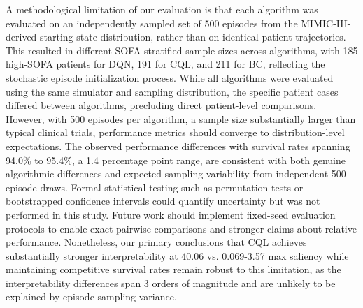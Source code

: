 A methodological limitation of our evaluation is that each algorithm was evaluated on an independently sampled set of 500 episodes from the MIMIC-III-derived starting state distribution, rather than on identical patient trajectories. This resulted in different SOFA-stratified sample sizes across algorithms, with 185 high-SOFA patients for DQN, 191 for CQL, and 211 for BC, reflecting the stochastic episode initialization process. While all algorithms were evaluated using the same simulator and sampling distribution, the specific patient cases differed between algorithms, precluding direct patient-level comparisons. However, with 500 episodes per algorithm, a sample size substantially larger than typical clinical trials, performance metrics should converge to distribution-level expectations. The observed performance differences with survival rates spanning 94.0\% to 95.4\%, a 1.4 percentage point range, are consistent with both genuine algorithmic differences and expected sampling variability from independent 500-episode draws. Formal statistical testing such as permutation tests or bootstrapped confidence intervals could quantify uncertainty but was not performed in this study. Future work should implement fixed-seed evaluation protocols to enable exact pairwise comparisons and stronger claims about relative performance. Nonetheless, our primary conclusions that CQL achieves substantially stronger interpretability at 40.06 vs. 0.069-3.57 max saliency while maintaining competitive survival rates remain robust to this limitation, as the interpretability differences span 3 orders of magnitude and are unlikely to be explained by episode sampling variance.

